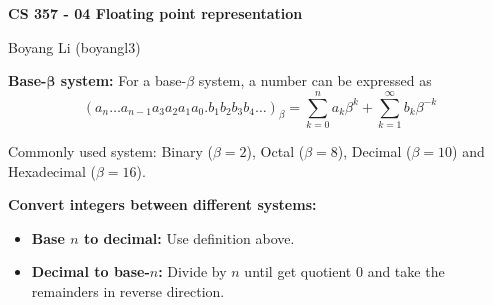 \documentclass[12pt]{article}
\begin{document}
\begin{center}\Large\bf 
CS 357 - 04 Floating point representation\\
\end{center}
\begin{center}
Boyang Li (boyangl3)
\end{center}

\medskip
\noindent \textbf{Base-$\boldsymbol{\beta}$ system:} For a base-$\beta$ system, a number can be expressed as 
$$(a_n\dots a_{n-1} a_3 a_2 a_1 a_0 . b_1 b_2 b_3 b_4 \dots)_\beta = \sum_{k=0}^{n} a_k \beta^k +\sum_{k = 1}^{\infty} b_k \beta^{-k}$$

Commonly used system: Binary ($\beta = 2$), Octal ($\beta = 8$), Decimal ($\beta=10$) and Hexadecimal ($\beta=16$).

\medskip
\noindent \textbf{Convert integers between different systems:}
    \begin{itemize}
        \item \textbf{Base $n$ to decimal:} Use definition above.
        \item \textbf{Decimal to base-$n$:} Divide by $n$ until get quotient 0 and take the remainders in reverse direction.
    \end{itemize}
\end{document}

